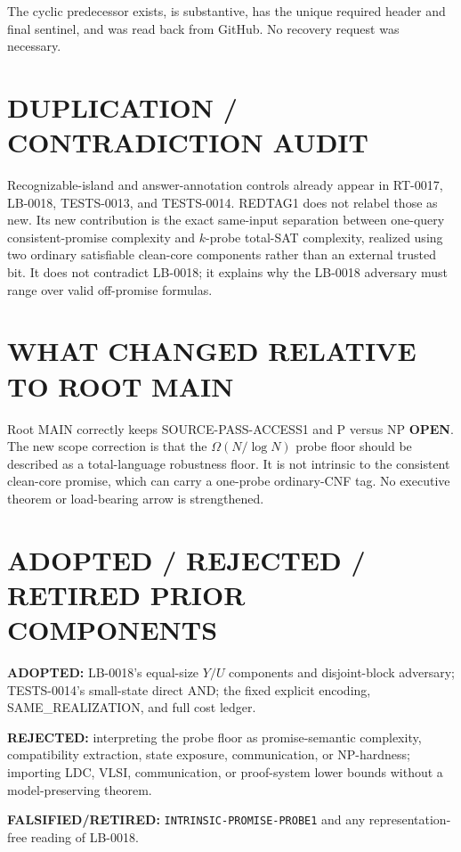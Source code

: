 \documentclass[11pt]{article}
\newcommand{\OPEN}{\textbf{OPEN}}
\begin{document}
The cyclic predecessor
exists, is substantive, has the unique required header and final sentinel,
and was read back from GitHub.  No recovery request was necessary.

\section{DUPLICATION / CONTRADICTION AUDIT}

Recognizable-island and answer-annotation controls already appear in
RT-0017, LB-0018, TESTS-0013, and TESTS-0014.  REDTAG1 does not relabel those
as new.  Its new contribution is the exact same-input separation between
one-query consistent-promise complexity and $k$-probe total-SAT complexity,
realized using two ordinary satisfiable clean-core components rather than an
external trusted bit.  It does not contradict LB-0018; it explains why the
LB-0018 adversary must range over valid off-promise formulas.

\section{WHAT CHANGED RELATIVE TO ROOT MAIN}

Root MAIN correctly keeps SOURCE-PASS-ACCESS1 and P versus NP \OPEN.
The new scope correction is that the $\Omega(N/\log N)$ probe floor should be
described as a total-language robustness floor.  It is not intrinsic to the
consistent clean-core promise, which can carry a one-probe ordinary-CNF tag.
No executive theorem or load-bearing arrow is strengthened.

\section{ADOPTED / REJECTED / RETIRED PRIOR COMPONENTS}

\textbf{ADOPTED:} LB-0018's equal-size $Y/U$ components and disjoint-block
adversary; TESTS-0014's small-state direct AND; the fixed explicit encoding,
SAME\_REALIZATION, and full cost ledger.

\textbf{REJECTED:} interpreting the probe floor as promise-semantic
complexity, compatibility extraction, state exposure, communication, or
NP-hardness; importing LDC, VLSI, communication, or proof-system lower bounds
without a model-preserving theorem.

\textbf{FALSIFIED/RETIRED:} \texttt{INTRINSIC-PROMISE-PROBE1} and any
representation-free reading of LB-0018.
\end{document}
